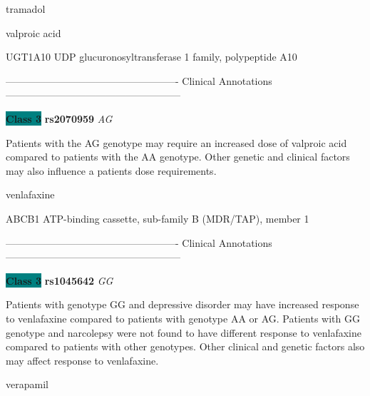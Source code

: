 \documentclass{resume} %
\begin{document}
\begin{rSection}{ tramadol }
\end{rSection}\begin{rSection}{ valproic acid }
\item[]

\begin{rSubsection}{ UGT1A10 }{ UDP glucuronosyltransferase 1 family, polypeptide A10 }{}{}
\item[]

\item[] ---------------------------------------------------- Clinical Annotations -----------------------------------------------------\newline
\item \textbf{\colorbox{teal} {Class 3}} \textbf{ rs2070959 } \textit{ AG }
\item[] Patients with the AG genotype may require an increased dose of valproic acid compared to patients with the AA genotype. Other genetic and clinical factors may also influence a patients dose requirements.
\end{rSubsection}

\end{rSection}\begin{rSection}{ venlafaxine }
\item[]

\begin{rSubsection}{ ABCB1 }{ ATP-binding cassette, sub-family B (MDR/TAP), member 1 }{}{}
\item[]

\item[] ---------------------------------------------------- Clinical Annotations -----------------------------------------------------\newline
\item \textbf{\colorbox{teal} {Class 3}} \textbf{ rs1045642 } \textit{ GG }
\item[] Patients with genotype GG and depressive disorder may have increased response to venlafaxine compared to patients with genotype AA or AG. Patients with GG genotype and narcolepsy were not found to have different response to venlafaxine compared to patients with other genotypes. Other clinical and genetic factors also may affect response to venlafaxine.
\end{rSubsection}

\end{rSection}\begin{rSection}{ verapamil }
\item[]


\end{rSection}
\end{document}
